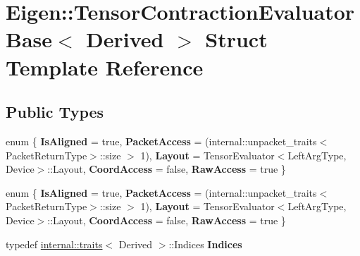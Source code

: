 \hypertarget{struct_eigen_1_1_tensor_contraction_evaluator_base}{}\section{Eigen\+:\+:Tensor\+Contraction\+Evaluator\+Base$<$ Derived $>$ Struct Template Reference}
\label{struct_eigen_1_1_tensor_contraction_evaluator_base}
\subsection*{Public Types}
\begin{DoxyCompactItemize}
\item 
\mbox{\label{struct_eigen_1_1_tensor_contraction_evaluator_base_a3b00d7dc690f668d2a1d3d05024816b1}} 
enum \{ \newline
{\bfseries Is\+Aligned} = true, 
{\bfseries Packet\+Access} = (internal\+:\+:unpacket\+\_\+traits$<$Packet\+Return\+Type$>$\+:\+:size $>$ 1), 
{\bfseries Layout} = Tensor\+Evaluator$<$Left\+Arg\+Type, Device$>$\+:\+:Layout, 
{\bfseries Coord\+Access} = false, 
\newline
{\bfseries Raw\+Access} = true
 \}
\item 
\mbox{\label{struct_eigen_1_1_tensor_contraction_evaluator_base_a8a5c36bcb7d3e12fe9066478abf51ee3}} 
enum \{ \newline
{\bfseries Is\+Aligned} = true, 
{\bfseries Packet\+Access} = (internal\+:\+:unpacket\+\_\+traits$<$Packet\+Return\+Type$>$\+:\+:size $>$ 1), 
{\bfseries Layout} = Tensor\+Evaluator$<$Left\+Arg\+Type, Device$>$\+:\+:Layout, 
{\bfseries Coord\+Access} = false, 
\newline
{\bfseries Raw\+Access} = true
 \}
\item 
\mbox{\label{struct_eigen_1_1_tensor_contraction_evaluator_base_afa6dea5d4bc12f61667ed05baecaa239}} 
typedef \hyperlink{struct_eigen_1_1internal_1_1traits}{internal\+::traits}$<$ Derived $>$\+::Indices {\bfseries Indices}
\item 
\mbox{\label{struct_eigen_1_1_tensor_contraction_evaluator_base_a5421c8a5abf7038189c9ed50be1a8246}} 

\end{DoxyCompactItemize}
